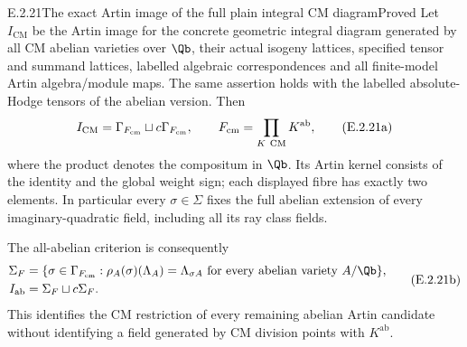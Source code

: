 \begin{result}{E.2.21}{The exact Artin image of the full plain integral CM diagram}{Proved}
Let \(I_{\mathrm{CM}}\) be the Artin image for the concrete
geometric integral diagram generated by all CM abelian varieties
over \(\Qb\), their actual isogeny lattices, specified tensor
and summand lattices, labelled algebraic correspondences and
all finite-model Artin algebra/module maps. The same assertion
holds with the labelled absolute-Hodge tensors of the abelian
version. Then
\[
 I_{\mathrm{CM}}
   =\Gamma_{F_{\mathrm{cm}}}\sqcup
        c\Gamma_{F_{\mathrm{cm}}},
 \qquad
 F_{\mathrm{cm}}=\prod_{K\ {\rm CM}}K^{\mathrm{ab}},
 \tag{E.2.21a}
\]
where the product denotes the compositum in \(\Qb\).
Its Artin kernel consists of the identity and the global
weight sign; each displayed fibre has exactly two elements.
In particular every \(\sigma\in\Sigma\) fixes the full
abelian extension of every imaginary-quadratic field,
including all its ray class fields.

The all-abelian criterion is consequently
\[
 \begin{split}
 \Sigma_F
  &=\{\sigma\in\Gamma_{F_{\mathrm{cm}}}:
       \rho_A(\sigma)(\Lambda_A)=\Lambda_{\sigma A}
       \text{ for every abelian variety }A/\Qb\},\\
 I_{\mathrm{ab}}&=\Sigma_F\sqcup c\Sigma_F .
 \end{split}
 \tag{E.2.21b}
\]
This identifies the CM restriction of every remaining
abelian Artin candidate without identifying a field
generated by CM division points with \(K^{\mathrm{ab}}\).
\end{result}

